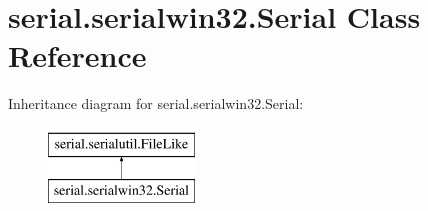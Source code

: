 \hypertarget{classserial_1_1serialwin32_1_1_serial}{}\section{serial.\+serialwin32.\+Serial Class Reference}
\label{classserial_1_1serialwin32_1_1_serial}
Inheritance diagram for serial.\+serialwin32.\+Serial\+:\begin{figure}[H]
\begin{center}
\leavevmode
\includegraphics[height=2.000000cm]{classserial_1_1serialwin32_1_1_serial}
\end{center}
\end{figure}
